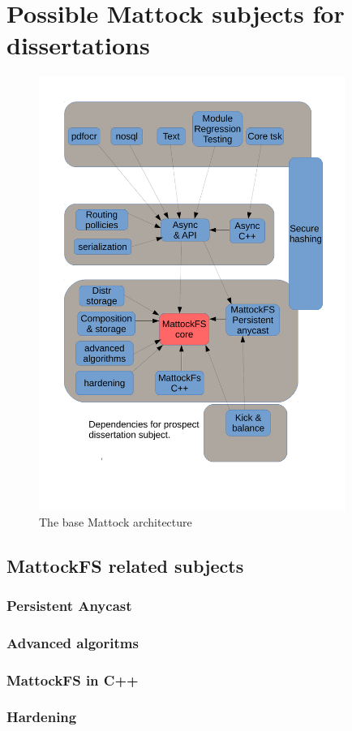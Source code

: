 \section{Possible Mattock subjects for dissertations}
\begin{figure}
\centering
\includegraphics[width=100mm]{mattock/future.pdf}
\caption{The base Mattock architecture}
\label{fig:FlowInOut}
\end{figure}
\subsection{MattockFS related subjects}
\subsubsection{Persistent Anycast}
\subsubsection{Advanced algoritms}
\subsubsection{MattockFS in C++}
\subsubsection{Hardening}
